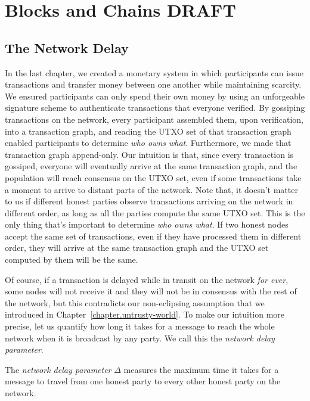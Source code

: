 \chapter{Blocks and Chains \small{\textsf{DRAFT}}}\label{chapter:blocks}

\section{The Network Delay}

In the last chapter, we created a monetary system in which participants can issue transactions
and transfer money between one another while maintaining scarcity. We ensured participants can
only spend their own money by using an unforgeable signature scheme to authenticate transactions
that everyone verified. By gossiping transactions on the network, every participant assembled
them, upon verification, into a transaction graph, and reading the UTXO set of that transaction
graph enabled participants to determine \emph{who owns what}.
Furthermore, we made that transaction graph append-only. Our intuition is that, since every
transaction is gossiped, everyone will eventually arrive at the same transaction graph,
and the population will reach consensus on the UTXO set, even if some transactions take
a moment to arrive to distant parts of the network. Note that, it doesn't matter to us if
different honest parties observe transactions arriving on the network in different order,
as long as all the parties compute the same UTXO set. This is the only thing that's important
to determine \emph{who owns what}. If two honest nodes accept the same set of transactions,
even if they have processed them in different order, they will arrive at the same transaction
graph and the UTXO set computed by them will be the same.

Of course, if a transaction is delayed while in transit on the network \emph{for ever}, some nodes
will not receive it and they will not be in consensus with the rest of the network, but this
contradicts our non-eclipsing assumption that we introduced in
Chapter~\ref{chapter.untrusty-world}. To make our intuition more precise, let us quantify how
long it takes for a message to reach the whole network when it is broadcast by any party.
We call this the \emph{network delay parameter}.

\begin{definition}
  The \emph{network delay parameter} $\Delta$ measures the maximum time it takes
  for a message to travel from one honest party to every other honest party on the
  network.
\end{definition}

